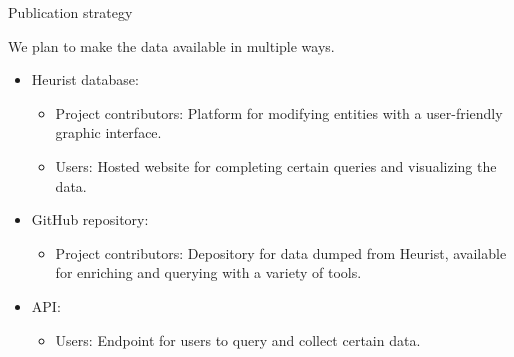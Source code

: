 \begin{frame}{Publication strategy}

    We plan to make the data available in multiple ways.

    \vspace{1em}
    
    \begin{itemize}
        \item Heurist database:
        \begin{itemize}
            \item Project contributors: Platform for modifying entities with a user-friendly graphic interface.
            \item Users: Hosted website for completing certain queries and visualizing the data.
        \end{itemize}
        \item GitHub repository:
        \begin{itemize}
            \item Project contributors: Depository for data dumped from Heurist, available for enriching and querying with a variety of tools.
        \end{itemize}
        \item API:
        \begin{itemize}
            \item Users: Endpoint for users to query and collect certain data.
        \end{itemize}
    \end{itemize}

\end{frame}